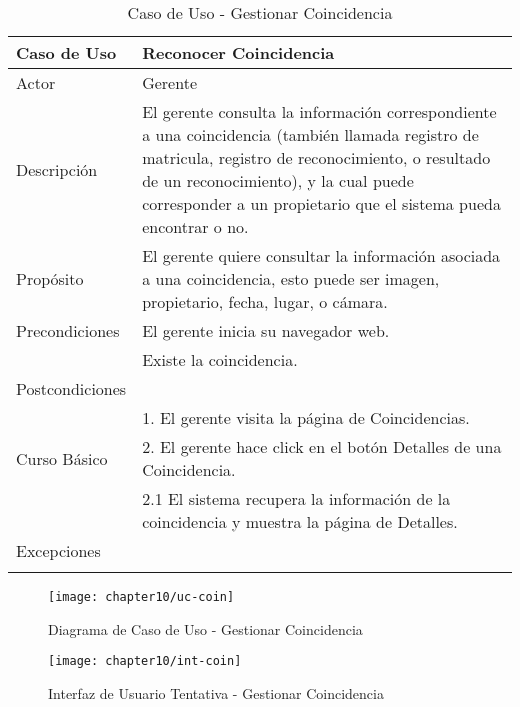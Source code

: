     \begin{longtable}{@{} p{3cm} p{10cm} @{}} \toprule
    \textbf{Caso de Uso}    & Reconocer Coincidencia \\ \midrule
    Actor                   & Gerente \\ \cmidrule{1-2}
    Descripción             & El gerente consulta la información correspondiente a una coincidencia (también llamada registro de matricula, registro de reconocimiento, o resultado de un reconocimiento), y la cual puede corresponder a un propietario que el sistema pueda encontrar o no. \\ \cmidrule{1-2}
    Propósito               & El gerente quiere consultar la información asociada a una coincidencia, esto puede ser imagen, propietario, fecha, lugar, o cámara. \\ \cmidrule{1-2}
    Precondiciones          & El gerente inicia su navegador web. \\ 
                            & Existe la coincidencia. \\ \cmidrule{1-2} 
    Postcondiciones         &  \\ \cmidrule{1-2} 
                            & 1. El gerente visita la página de Coincidencias. \\ 
    Curso Básico            & 2. El gerente hace click en el botón Detalles de una Coincidencia. \\
                            & 2.1 El sistema recupera la información de la coincidencia y muestra la página de Detalles. \\ \cmidrule{1-2}
    Excepciones             & \\ \bottomrule
   \caption{Caso de Uso - Gestionar Coincidencia} \label{tab:tabcu-coin}  \\
   \end{longtable}
    
    \begin{figure}[H]
        \centering
        \texttt{[image: chapter10/uc-coin]}
        \caption{Diagrama de Caso de Uso - Gestionar Coincidencia}
        \label{fig:uc-coin}
    \end{figure}
    
  \begin{figure}[H]
        \centering
        \texttt{[image: chapter10/int-coin]}
        \caption{Interfaz de Usuario Tentativa - Gestionar Coincidencia}
        \label{fig:int-coin}
    \end{figure}
    
